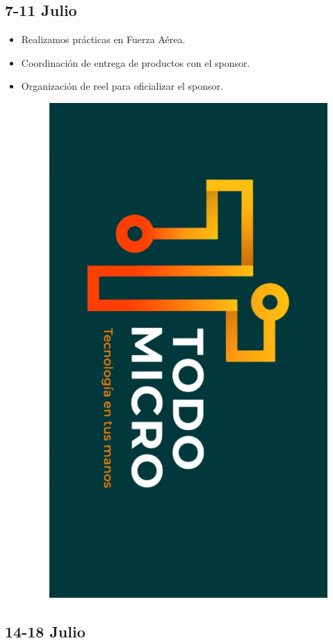 \documentclass[12pt,a4paper]{article}
\begin{document}
\subsection*{7-11 Julio}
\begin{itemize}

\item Realizamos prácticas en Fuerza Aérea.
\item Coordinación de entrega de productos con el sponsor.
\item Organización de reel para oficializar el sponsor.
\begin{figure}[H]
    \centering
    \includegraphics[angle=90, width=0.75\linewidth]{Carpeta de campo/Reeltodomicro.png}
\end{figure}

\end{itemize}

\subsection*{14-18 Julio}
\end{document}
